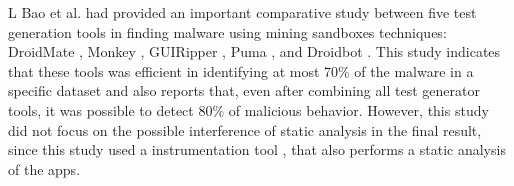 L Bao et al. \cite{bao2018mining} had provided an important comparative study between five test generation tools in finding malware using mining sandboxes techniques: DroidMate \cite{jamrozik2016droidmate}, Monkey \cite{Monkey}, GUIRipper \cite{amalfitano2012using}, Puma \cite{hao2014puma}, and Droidbot \cite{li2017droidbot}. This study indicates that these tools was efficient in identifying at most 70\% of the malware in a specific dataset and also reports that, even after combining all test generator tools, it was possible to detect 80\% of malicious behavior. However, this study did not focus on the possible interference of static analysis in the final result, since this study used a instrumentation tool \cite{cai2017droidfax}, that also performs a static analysis of the apps.